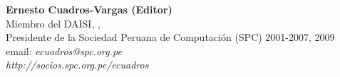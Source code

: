 \begin{center}
\textbf{Ernesto Cuadros-Vargas (Editor)}\\ 
Miembro del DAISI, \University, \city\\
Presidente de la Sociedad Peruana de Computación (SPC) 2001-2007, 2009\\
email: \textit{ecuadros@spc.org.pe}\\
\textit{http://socios.spc.org.pe/ecuadros}
\end{center}

